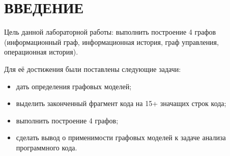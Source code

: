 \chapter*{ВВЕДЕНИЕ}
Цель данной лабораторной работы: выполнить построение 4 графов (информационный граф, информационная история, граф управления, операционная история).

Для её достижения были поставлены следующие задачи:
\begin{itemize}
	\item дать определения графовых моделей;
	\item выделить законченный фрагмент кода на 15+ значащих строк кода;
	\item выполнить построение 4 графов;
	\item сделать вывод о применимости графовых моделей к задаче анализа программного кода.
\end{itemize}